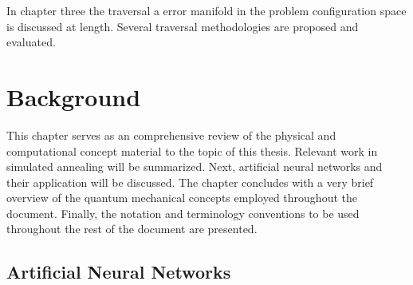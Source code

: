 \documentclass[11pt]{afthesis}
\begin{document}


In chapter three the traversal a error manifold in the problem configuration space is discussed at length. Several traversal methodologies are proposed and evaluated. 



\chapter{Background} %



This chapter serves as an comprehensive review of the physical and computational concept material to the topic of this thesis. Relevant work in simulated annealing will be summarized. Next, artificial neural networks and their application will be discussed. The chapter concludes with a very brief overview of the quantum mechanical concepts employed throughout the document. Finally, the notation and terminology conventions to be used throughout the rest of the document are presented.

\section{Artificial Neural Networks}
\end{document}
